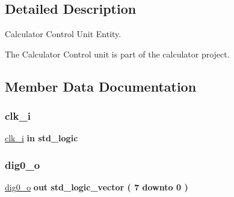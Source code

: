 \subsection{Detailed Description}
Calculator Control Unit Entity. 

The Calculator Control unit is part of the calculator project. 

\subsection{Member Data Documentation}
\mbox{\label{classcalc__ctrl_abe949478e3f8aad0a6aeb1842fa6c608}} 
\subsubsection{\texorpdfstring{clk\+\_\+i}{clk\_i}}
{\footnotesize\ttfamily \hyperlink{classcalc__ctrl_abe949478e3f8aad0a6aeb1842fa6c608}{clk\+\_\+i} {\bfseries \textcolor{keywordflow}{in}\textcolor{vhdlchar}{ }} {\bfseries \textcolor{comment}{std\+\_\+logic}\textcolor{vhdlchar}{ }} \hspace{0.3cm}{\ttfamily [Port]}}

\mbox{\label{classcalc__ctrl_ae2904ffa81e882d04f8595d84c2f8c9a}} 
\subsubsection{\texorpdfstring{dig0\+\_\+o}{dig0\_o}}
{\footnotesize\ttfamily \hyperlink{classcalc__ctrl_ae2904ffa81e882d04f8595d84c2f8c9a}{dig0\+\_\+o} {\bfseries \textcolor{keywordflow}{out}\textcolor{vhdlchar}{ }} {\bfseries \textcolor{comment}{std\+\_\+logic\+\_\+vector}\textcolor{vhdlchar}{ }\textcolor{vhdlchar}{(}\textcolor{vhdlchar}{ }\textcolor{vhdlchar}{ } \textcolor{vhdldigit}{7} \textcolor{vhdlchar}{ }\textcolor{keywordflow}{downto}\textcolor{vhdlchar}{ }\textcolor{vhdlchar}{ } \textcolor{vhdldigit}{0} \textcolor{vhdlchar}{ }\textcolor{vhdlchar}{)}\textcolor{vhdlchar}{ }} \hspace{0.3cm}{\ttfamily [Port]}}

\mbox{\label{classcalc__ctrl_a30f5823bfbad17a9d14d0d3ac377d36f}} 
